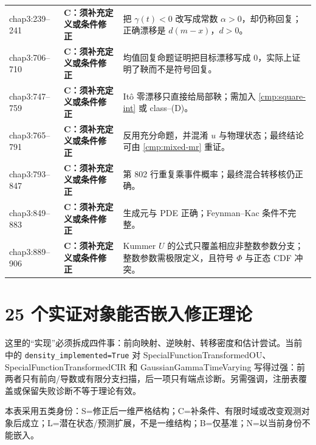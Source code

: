 \documentclass[UTF8,11pt]{ctexart}
\newcommand{\Ccat}{\textcolor{orange!80!black}{\textbf{C：须补充定义或条件修正}}}
\begin{document}
\begin{longtable}{p{}p{}p{}}
chap3:239--241 & \Ccat & 把 $\gamma(t)<0$ 改写成常数 $\alpha>0$，却仍称回复；正确漂移是 $d(m-x)$，$d>0$。\\
chap3:706--710 & \Ccat & 均值回复命题证明把目标漂移写成 0，实际上证明了鞅而不是符号回复。\\
chap3:747--759 & \Ccat & It\^o 零漂移只直接给局部鞅；需加入 \eqref{cmp:square-int} 或 class--(D)。\\
chap3:765--791 & \Ccat & 反用充分命题，并混淆 $u$ 与物理状态；最终结论可由 \eqref{cmp:mixed-mr} 重证。\\
chap3:793--847 & \Ccat & 第 802 行重复乘事件概率；最终混合转移核仍正确。\\
chap3:849--883 & \Ccat & 生成元与 PDE 正确；Feynman--Kac 条件不完整。\\
chap3:889--906 & \Ccat & Kummer $U$ 的公式只覆盖相应非整数参数分支；整数参数需极限定义，且符号 $\Phi$ 与正态 CDF 冲突。\\
\bottomrule
\end{longtable}

\section{25 个实证对象能否嵌入修正理论}

这里的“实现”必须拆成四件事：前向映射、逆映射、转移密度和估计尝试。当前
 中的
\texttt{density\_implemented=True} 对 SpecialFunctionTransformedOU、
SpecialFunctionTransformedCIR 和 GaussianGammaTimeVarying 写得过强：前两者只有前向/导数或有限分支扫描，后一项只有端点诊断。另需强调，注册表覆盖或保留失败诊断不等于理论有效。

本表采用五类身份：S=修正后一维严格结构；C=补条件、有限时域或改变观测对象后成立；L=潜在状态/预测扩展，不是一维结构；B=仅基准；N=以当前身份不能嵌入。
\end{document}
